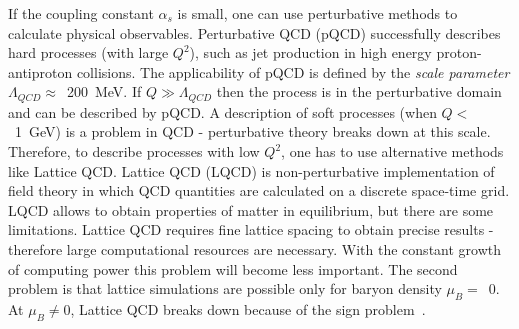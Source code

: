       If the coupling constant $\alpha_s$ is small, one can use perturbative methods to calculate physical observables.
      Perturbative QCD (pQCD) successfully describes hard processes (with large $Q^2$), such as jet production in high energy proton-antiproton collisions.
      The applicability of pQCD is defined by the \textit{scale parameter} $\Lambda_{QCD} \approx$~200~MeV.
      If $Q \gg \Lambda_{QCD}$ then the process is in the perturbative domain and can be described by pQCD.
      A description of soft processes (when $Q <$~1~GeV) is a problem in QCD - perturbative theory breaks down at this scale.
      Therefore, to describe processes with low $Q^2$, one has to use alternative methods like Lattice QCD.
      Lattice QCD (LQCD) is non-perturbative implementation of field theory in which QCD quantities are calculated on a discrete space-time grid.
      LQCD allows to obtain properties of matter in equilibrium, but there are some limitations.
      Lattice QCD requires fine lattice spacing to obtain precise results - therefore large computational resources are necessary.
      With the constant growth of computing power this problem will become less important.
      The second problem is that lattice simulations are possible only for baryon density $\mu_B = $~0.
      At $\mu_B \neq 0$, Lattice QCD breaks down because of the sign problem~\cite{qcd_fodor}.
      
